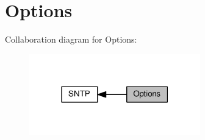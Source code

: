 \hypertarget{group__sntp__opts}{}\section{Options}
\label{group__sntp__opts}
Collaboration diagram for Options\+:
\nopagebreak
\begin{figure}[H]
\begin{center}
\leavevmode
\includegraphics[width=210pt]{group__sntp__opts}
\end{center}
\end{figure}
